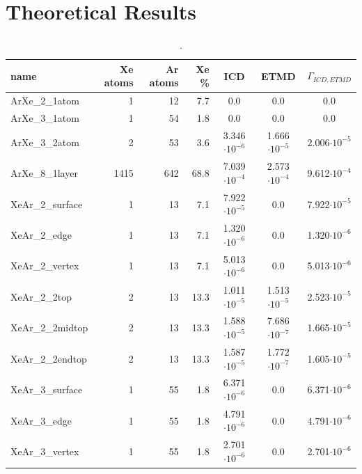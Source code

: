\section{Theoretical Results}


\begin{table}
\centering
\caption{.}
\begin{tabular}{lrrrccc}
\toprule
name                 & Xe atoms & Ar atoms & Xe \% &   ICD                &  ETMD                & $\Gamma_{ICD,ETMD}$\\
\midrule
ArXe\_2\_1atom       &      1   &     12   &  7.7  &      0.0             &  0.0                 &     0.0            \\
ArXe\_3\_1atom       &      1   &     54   &  1.8  &      0.0             &  0.0                 &     0.0            \\ 
ArXe\_3\_2atom       &      2   &     53   &  3.6  & 3.346$\cdot 10^{-6}$ & 1.666$\cdot 10^{-5}$ & 2.006$\cdot 10^{-5}$ \\
ArXe\_8\_1layer      &   1415   &    642   & 68.8  & 7.039$\cdot 10^{-4}$ & 2.573$\cdot 10^{-4}$ & 9.612$\cdot 10^{-4}$ \\
\midrule
XeAr\_2\_surface     &      1   &     13   &  7.1  & 7.922$\cdot 10^{-5}$ & 0.0                  & 7.922$\cdot 10^{-5}$ \\
XeAr\_2\_edge        &      1   &     13   &  7.1  & 1.320$\cdot 10^{-6}$ & 0.0                  & 1.320$\cdot 10^{-6}$ \\
XeAr\_2\_vertex      &      1   &     13   &  7.1  & 5.013$\cdot 10^{-6}$ & 0.0                  & 5.013$\cdot 10^{-6}$ \\
XeAr\_2\_2top        &      2   &     13   & 13.3  & 1.011$\cdot 10^{-5}$ & 1.513$\cdot 10^{-5}$ & 2.523$\cdot 10^{-5}$ \\
XeAr\_2\_2midtop     &      2   &     13   & 13.3  & 1.588$\cdot 10^{-5}$ & 7.686$\cdot 10^{-7}$ & 1.665$\cdot 10^{-5}$ \\
XeAr\_2\_2endtop     &      2   &     13   & 13.3  & 1.587$\cdot 10^{-5}$ & 1.772$\cdot 10^{-7}$ & 1.605$\cdot 10^{-5}$ \\
XeAr\_3\_surface     &      1   &     55   &  1.8  & 6.371$\cdot 10^{-6}$ & 0.0                  & 6.371$\cdot 10^{-6}$ \\
XeAr\_3\_edge        &      1   &     55   &  1.8  & 4.791$\cdot 10^{-6}$ & 0.0                  & 4.791$\cdot 10^{-6}$ \\
XeAr\_3\_vertex      &      1   &     55   &  1.8  & 2.701$\cdot 10^{-6}$ & 0.0                  & 2.701$\cdot 10^{-6}$ \\

\end{tabular}
\end{table}
